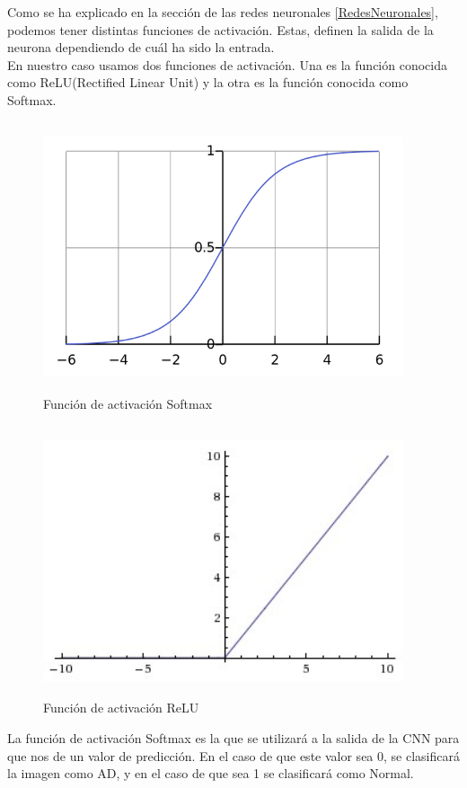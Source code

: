 Como se ha explicado en la sección de las redes neuronales \ref{RedesNeuronales}, podemos tener distintas funciones de activación. Estas, definen la salida de la neurona dependiendo de cuál ha sido la entrada.\\

En nuestro caso usamos dos funciones de activación. Una es la función conocida como ReLU(Rectified Linear Unit) y la otra es la función conocida como Softmax.
\begin{figure}[H]
	\centering
	\caption{Función de activación Softmax}
	\includegraphics[height=300px,width=400px]{./imagenes/softmax.png}
\end{figure}
\newpage
\begin{figure}[H]
	\centering
	\caption{Función de activación ReLU}
	\includegraphics[height=300px,width=400px]{./imagenes/relu.jpg}
\end{figure}

La función de activación Softmax es la que se utilizará a la salida de la CNN para que nos de un valor de predicción. En el caso de que este valor sea 0, se clasificará la imagen como AD, y en el caso de que sea 1 se clasificará como Normal.\\

